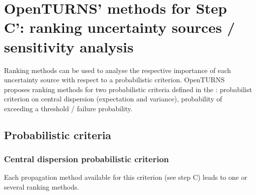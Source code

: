 
\newpage

\newpage

\newpage

\newpage

\newpage

\newpage

\newpage

\newpage

\newpage

\newpage

\newpage

\newpage

\newpage

\newpage

\newpage

\newpage

\newpage

\newpage

\newpage

\newpage

\newpage

\newpage

\section{OpenTURNS' methods for Step C': ranking uncertainty sources / sensitivity analysis}

Ranking methods can be used to analyse the respective importance of each uncertainty source with respect to a probabilistic criterion.
OpenTURNS proposes ranking methods for two probabilistic criteria defined in the : probabilist criterion on central dispersion (expectation and variance), probability of exceeding a threshold / failure probability.

\subsection{Probabilistic criteria}

\subsubsection{Central dispersion probabilistic criterion}

Each propagation method available for this criterion (see step C) leads to one or several ranking methods.

